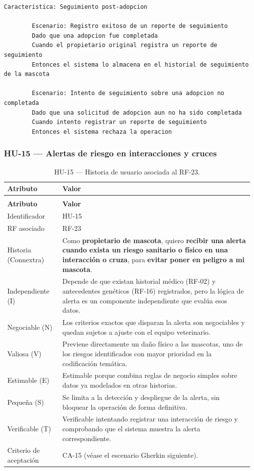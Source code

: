 \documentclass[journal,onecolumn]{IEEEtran}
\makeatletter
\newenvironment{atributos}[2]{%
	\small
	\begin{longtable}{@{}>{\raggedright\arraybackslash}p{4.2cm} >{\raggedright\arraybackslash}p{11.2cm}@{}}
		\caption{#2}\label{tab:#1}\\
		\toprule
		\textbf{Atributo} & \textbf{Valor} \\
		\midrule
		\endfirsthead
		\multicolumn{2}{@{}l}{\small\itshape (continuación)}\\
		\toprule
		\textbf{Atributo} & \textbf{Valor} \\
		\midrule
		\endhead
		\bottomrule
		\endlastfoot
	}{%
	\end{longtable}
	\normalsize
}
\makeatother
\begin{document}
	\begin{lstlisting}[style=gherkin,caption={CA-14 --- Escenario de aceptación de la historia HU-14.},label={lst:ca14}]
		Caracteristica: Seguimiento post-adopcion
		
		Escenario: Registro exitoso de un reporte de seguimiento
		Dado que una adopcion fue completada
		Cuando el propietario original registra un reporte de seguimiento
		Entonces el sistema lo almacena en el historial de seguimiento de la mascota
		
		Escenario: Intento de seguimiento sobre una adopcion no completada
		Dado que una solicitud de adopcion aun no ha sido completada
		Cuando intento registrar un reporte de seguimiento
		Entonces el sistema rechaza la operacion
	\end{lstlisting}
	
	\subsubsection{HU-15 --- Alertas de riesgo en interacciones y cruces}
	
	\begin{atributos}{HU-15}{HU-15 --- Historia de usuario asociada al RF-23.}
		Identificador & HU-15 \\
		RF asociado & RF-23 \\
		Historia (Connextra) & Como \textbf{propietario de mascota}, quiero \textbf{recibir una alerta cuando exista un riesgo sanitario o físico en una interacción o cruza}, para \textbf{evitar poner en peligro a mi mascota}. \\
		Independiente (I) & Depende de que existan historial médico (RF-02) y antecedentes genéticos (RF-16) registrados, pero la lógica de alerta es un componente independiente que evalúa esos datos. \\
		Negociable (N) & Los criterios exactos que disparan la alerta son negociables y quedan sujetos a ajuste con el equipo veterinario. \\
		Valiosa (V) & Previene directamente un daño físico a las mascotas, uno de los riesgos identificados con mayor prioridad en la codificación temática. \\
		Estimable (E) & Estimable porque combina reglas de negocio simples sobre datos ya modelados en otras historias. \\
		Pequeña (S) & Se limita a la detección y despliegue de la alerta, sin bloquear la operación de forma definitiva. \\
		Verificable (T) & Verificable intentando registrar una interacción de riesgo y comprobando que el sistema muestra la alerta correspondiente. \\
		Criterio de aceptación & CA-15 (véase el escenario Gherkin siguiente). \\
	\end{atributos}
	
\end{document}

